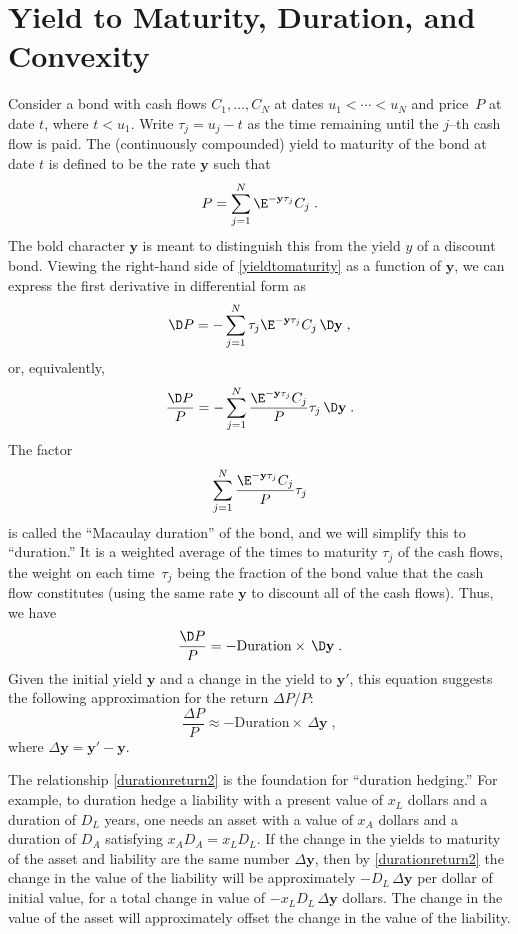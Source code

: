 \section{Yield to Maturity, Duration, and Convexity}\label{s_duration}

Consider a bond with cash flows $C_1, \ldots, C_N$ at dates $u_1 < \cdots < u_N$ and price~$P$ at date $t$, where $t< u_1$.  Write $\tau_j = u_j-t$ as the time remaining until the $j$--th cash flow is paid.  The (continuously compounded) yield to maturity  of the bond at date $t$ is defined to be the rate $\mathbf{y}$ such that
\begin{equation}\label{yieldtomaturity}
P = \sum_{j=1}^N \E^{-\mathbf{y}\tau_j}C_j\;.
\end{equation}
The bold character $\mathbf{y}$ is meant to distinguish this from the yield $y$ of a discount bond. 
Viewing the right-hand side of \eqref{yieldtomaturity} as a function of $\mathbf{y}$, we can express the first derivative in differential form as
$$\D P = -\sum_{j=1}^N \tau_j\E^{-\mathbf{y}\tau_j}C_j\, \D \mathbf{y}\; ,$$
or, equivalently,
$$\frac{\D P}{P} = -\sum_{j=1}^N \frac{\E^{-\mathbf{y}\tau_j}C_j}{P}\tau_j\, \D \mathbf{y}\; .$$
The factor 
$$\sum_{j=1}^N \frac{\E^{-\mathbf{y}\tau_j}C_j}{P}\tau_j$$
is called the ``Macaulay duration''  of the bond, and we will simplify this to ``duration.''   It is a weighted average of the times to maturity $\tau_j$ of the cash flows, the weight on each time~$\tau_j$ being the fraction of the bond value that the cash flow constitutes (using the same rate $\mathbf{y}$ to discount all of the cash flows).   Thus, we have
\begin{equation}\label{durationreturn}
\frac{\D P}{P} = - \text{Duration} \times \,\D \mathbf{y}\;.
\end{equation}
Given the initial yield $\mathbf{y}$ and a change in the yield to $\mathbf{y}'$, this equation suggests 
\vfil\eject
\noindent the following approximation for the return $\varDelta P/P$:
\begin{equation}\label{durationreturn2}
\frac{\varDelta P}{P} \approx  -  \text{Duration}  \times \,\varDelta \mathbf{y}\;,
\end{equation}
where $\varDelta \mathbf{y} = \mathbf{y}'-\mathbf{y}$.  

The relationship \eqref{durationreturn2} is the foundation for ``duration hedging.''   For example, to duration hedge a liability with a present value of $x_L$  dollars and a duration of $D_L$ years, one needs an asset with a value of $x_A$ dollars and a  duration of $D_A$ satisfying $x_AD_A = x_LD_L$.  If the change in  the yields to maturity of the asset and liability are the same number $\varDelta \mathbf{y}$, then by \eqref{durationreturn2} the change in the value of the liability will be approximately $-D_L\,\varDelta \mathbf{y}$ per dollar of initial value, for a total change in value of $-x_LD_L\,\varDelta \mathbf{y}$ dollars.  The change in the value of the asset will approximately offset the change in the value of the liability.

